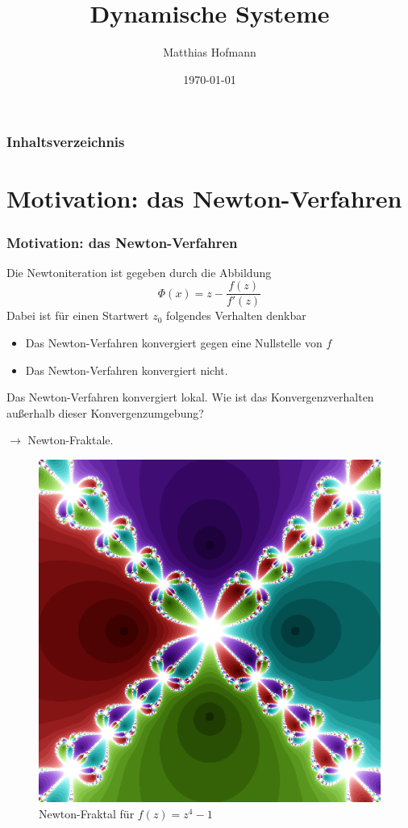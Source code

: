 \documentclass{beamer}
\title{Dynamische Systeme}
\author{Matthias Hofmann}
\date{\today}
\theoremstyle{definition}
\begin{document}
\begin{frame}
	\titlepage
\end{frame}

\begin{frame}
	\frametitle{Inhaltsverzeichnis}
	\tableofcontents
\end{frame}

\section{Motivation: das Newton-Verfahren}
\begin{frame}
\frametitle{Motivation: das Newton-Verfahren}
Die Newtoniteration ist gegeben durch die Abbildung
\[
	\Phi(x)=z-\frac{f(z)}{f'(z)}
\]
Dabei ist für einen Startwert $z_0$ folgendes Verhalten denkbar
\begin{itemize}
\item Das Newton-Verfahren konvergiert gegen eine Nullstelle von $f$
\item Das Newton-Verfahren konvergiert nicht.
\end{itemize}

Das Newton-Verfahren konvergiert lokal. Wie ist das Konvergenzverhalten außerhalb dieser Konvergenzumgebung?

$\longrightarrow$ Newton-Fraktale.
\end{frame}

\begin{frame}
\begin{figure}
\centering
\includegraphics[scale=0.4]{fraktal.png}
\caption{Newton-Fraktal für $f(z)=z^4-1$}
\end{figure}
\end{frame}
\end{document}
